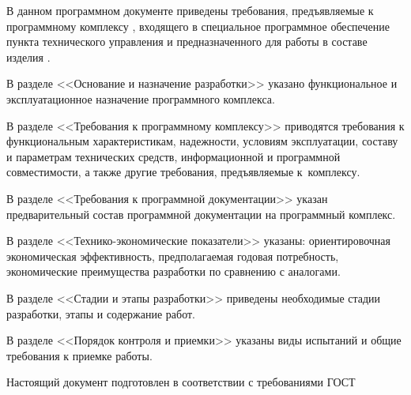 \newpage\annotation

В данном программном документе приведены требования, предъявляемые к программному комплексу \programname, входящего в специальное программное обеспечение пункта технического управления и предназначенного для работы в составе изделия \productname. 

В разделе <<Основание и назначение разработки>> указано функциональное и эксплуатационное назначение программного комплекса.

В разделе <<Требования к программному комплексу>> приводятся требования к функциональным характеристикам, надежности, условиям эксплуатации, составу и параметрам технических средств, информационной и программной совместимости, а также другие требования, предъявляемые к~комплексу. 

В разделе <<Требования к программной документации>> указан предварительный состав программной документации на программный комплекс.

В разделе <<Технико-экономические показатели>> указаны: ориентировочная экономическая эффективность, предполагаемая годовая потребность, экономические преимущества разработки по сравнению с аналогами.

В разделе <<Стадии и этапы разработки>> приведены необходимые стадии разработки, этапы и содержание работ.

В разделе <<Порядок контроля и приемки>> указаны виды испытаний и общие требования к приемке работы.

Настоящий документ подготовлен в соответствии с требованиями ГОСТ~\cite{gost19201}
